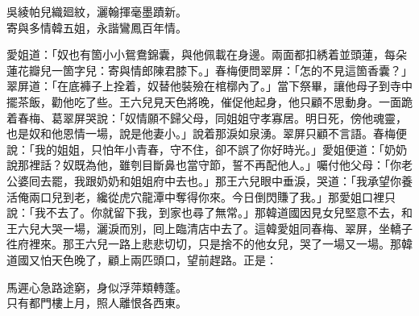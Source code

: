 \begin{myquote}
吳綾帕兒織廻紋，灑翰揮毫墨蹟新。\\寄與多情韓五姐，永諧鸞鳳百年情。{}
\end{myquote}

愛姐道：「奴也有箇小小鴛鴦錦囊，與他佩載在身邊。兩面都扣綉着並頭蓮，每朵蓮花瓣兒一箇字兒：寄與情郎陳君膝下。」春梅便問翠屏：「怎的不見這箇香囊？」翠屏道：「在底褲子上拴着，奴替他裝殮在棺槨內了。」當下祭畢，讓他母子到寺中擺茶飯，勸他吃了些。王六兒見天色將晚，催促他起身，他只顧不思動身。一面跪着春梅、葛翠屏哭說：「奴情願不歸父母，同姐姐守孝寡居。明日死，傍他魂靈，也是奴和他恩情一場，說是他妻小。」說着那淚如泉湧。{}翠屏只顧不言語。春梅便說：「我的姐姐，只怕年小青春，守不住，卻不誤了你好時光。」愛姐便道：「奶奶說那裡話？奴既為他，雖刳目斷鼻也當守節，誓不再配他人。」囑付他父母：「你老公婆囘去罷，我跟奶奶和姐姐府中去也。」那王六兒眼中垂淚，哭道：「我承望你養活俺兩口兒到老，纔從虎穴龍潭中奪得你來。今日倒閃賺了我。」那愛姐口裡只說：「我不去了。你就留下我，到家也尋了無常。」{}那韓道國因見女兒堅意不去，和王六兒大哭一場，灑淚而別，囘上臨清店中去了。這韓愛姐同春梅、翠屏，坐轎子徃府裡來。那王六兒一路上悲悲切切，只是捨不的他女兒，哭了一場又一場。{}那韓道國又怕天色晚了，顧上兩匹頭口，望前趕路。正是：

\begin{myquote}
馬遲心急路途窮，身似浮萍類轉蓬。\\只有都門樓上月，照人離恨各西東。
\end{myquote}

